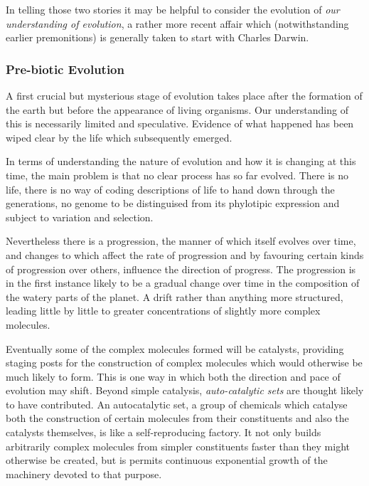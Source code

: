 \documentclass[10pt,titlepage]{article}
\begin{document}
In telling those two stories it may be helpful to consider the evolution of \emph{our understanding of evolution}, a rather more recent affair which (notwithstanding earlier premonitions) is generally taken to start with Charles Darwin\cite{darwin-oos}.



  \subsubsection{Pre-biotic Evolution}

  A first crucial but mysterious stage of evolution takes place after the formation of the earth but before the appearance of living organisms.
  Our understanding of this is necessarily limited and speculative.
  Evidence of what happened has been wiped clear by the life which subsequently emerged.

  In terms of understanding the nature of evolution and how it is changing at this time, the main problem is that no clear process has so far evolved.
  There is no life, there is no way of coding descriptions of life to hand down through the generations, no genome to be distinguised from its phylotipic expression and subject to variation and selection.

  Nevertheless there is a progression, the manner of which itself evolves over time, and changes to which affect the rate of progression and by favouring certain kinds of progression over others, influence the direction of progress.
  The progression is in the first instance likely to be a gradual change over time in the composition of the watery parts of the planet.
  A drift rather than anything more structured, leading little by little to greater concentrations of slightly more complex molecules.

  Eventually some of the complex molecules formed will be catalysts, providing staging posts for the construction of complex molecules which would otherwise be much likely to form.
  This is one way in which both the direction and pace of evolution may shift.
  Beyond simple catalysis, \emph{auto-catalytic sets} are thought likely to have contributed.
  An autocatalytic set, a group of chemicals which catalyse both the construction of certain molecules from their constituents and also the catalysts themselves, is like a self-reproducing factory.
  It not only builds arbitrarily complex molecules from simpler constituents faster than they might otherwise be created, but is permits continuous exponential growth of the machinery devoted to that purpose.
\end{document}
